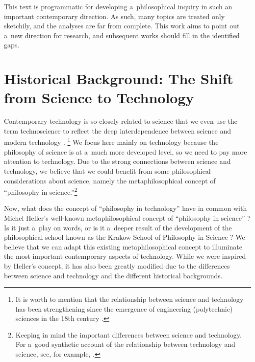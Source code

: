 This text is programmatic for developing a~philosophical inquiry in such an important contemporary direction. As such, many topics are treated only sketchily, and the analyses are far from complete. This work aims to point out a~new direction for research, and subsequent works should fill in the identified gaps.



\section{Historical Background: The Shift from Science to Technology}

Contemporary technology is so closely related to science that we even use the term technoscience to reflect the deep interdependence between science and modern technology 
\parencite[][]{hottois_technoscience_2023}.%
\footnote{It is worth to mention that the relationship between science and technology has been strengthening since the emergence of engineering (polytechnic) sciences in the 18th century 
\parencite[][p.669]{janeczek_nauka_2019}.%
} We focus here mainly on technology because the philosophy of science is at a~much more developed level, so we need to pay more attention to technology. Due to the strong connections between science and technology, we believe that we could benefit from some philosophical considerations about science, namely the metaphilosophical concept of ``philosophy in science.''\footnote{Keeping in mind the important differences between science and technology. For a~good synthetic account of the relationship between technology and science, see, for example, 
\parencite[][]{franssen_philosophy_2023}.%
}



Now, what does the concept of ``philosophy in technology'' have in common with Michel Heller's well-known metaphilosophical concept of ``philosophy in science'' 
\parencites[][]{heller_how_2019}[see also][]{polak_philosophy_2019}? %
 Is it just a~play on words, or is it a~deeper result of the development of the philosophical school known as the Krakow School of Philosophy in Science 
\parencite[][]{polak_krakow_2022}? %
 We believe that we can adapt this existing metaphilosophical concept to illuminate the most important contemporary aspects of technology. While we were inspired by Heller's concept, it has also been greatly modified due to the differences between science and technology and the different historical backgrounds.



